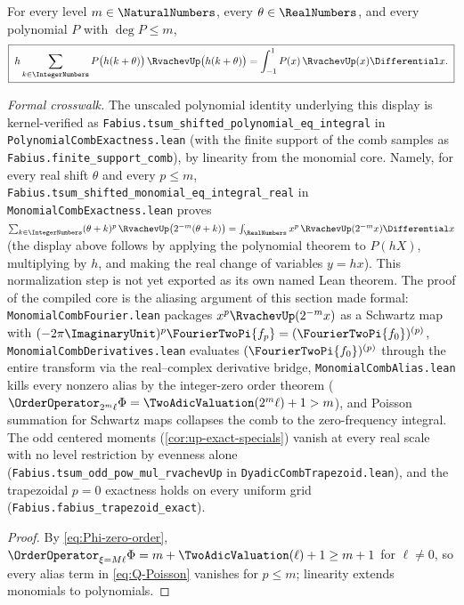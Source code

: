 \begin{theorem}
\label{thm:shifted-exactness}
For every level $m\in\NaturalNumbers$, every $\theta\in\RealNumbers$, and every polynomial
$P$ with $\deg P\le m$,
\begin{equation}
 \boxed{\;
 h\sum_{k\in\IntegerNumbers}P\bigl(h(k+\theta)\bigr)\,
 \RvachevUp\bigl(h(k+\theta)\bigr)
 =\int_{-1}^{1}P(x)\,\RvachevUp(x)\Differential x.
 \;}
 \label{eq:polynomial-exactness}
\end{equation}
\end{theorem}

\emph{Formal crosswalk.}  The unscaled polynomial identity underlying this display is
kernel-verified as \nolinkurl{Fabius.tsum_shifted_polynomial_eq_integral} in
\nolinkurl{PolynomialCombExactness.lean} (with the finite support of the comb samples
as \nolinkurl{Fabius.finite_support_comb}), by linearity from the monomial core.  Namely, for
every real shift $\theta$ and every $p\le m$,
\nolinkurl{Fabius.tsum_shifted_monomial_eq_integral_real} in
\nolinkurl{MonomialCombExactness.lean} proves
$\sum_{k\in\IntegerNumbers}(\theta+k)^{p}\,\RvachevUp\bigl(2^{-m}(\theta+k)\bigr)=\int_\RealNumbers x^{p}\,\RvachevUp(2^{-m}x)\Differential x$
(the display above follows by applying the polynomial theorem to $P(hX)$, multiplying
by $h$, and making the real change of variables $y=h x$).  This normalization step is
not yet exported as its own named Lean theorem.  The proof of the compiled core is the aliasing argument of this
section made formal: \nolinkurl{MonomialCombFourier.lean} packages $x^{p}\RvachevUp(2^{-m}x)$ as a
Schwartz map with
$(-2\pi\ImaginaryUnit)^{p}\FourierTwoPi{f_p}=(\FourierTwoPi{f_0})^{(p)}$,
\nolinkurl{MonomialCombDerivatives.lean} evaluates $(\FourierTwoPi{f_0})^{(p)}$ through the entire
transform via the real--complex derivative bridge, \nolinkurl{MonomialCombAlias.lean} kills
every nonzero alias by the integer-zero order theorem
($\OrderOperator_{2^{m}\ell}\Phi=\TwoAdicValuation(2^{m}\ell)+1>m$),
and Poisson summation for Schwartz maps collapses the comb to the zero-frequency
integral.  The odd centered moments (\cref{cor:up-exact-specials}) vanish at every real
scale with no level restriction by evenness alone
(\nolinkurl{Fabius.tsum_odd_pow_mul_rvachevUp} in \nolinkurl{DyadicCombTrapezoid.lean}), and the
trapezoidal $p=0$ exactness holds on every uniform grid
(\nolinkurl{Fabius.fabius_trapezoid_exact}).

\begin{proof}
By \eqref{eq:Phi-zero-order},
$\OrderOperator_{\xi=M\ell}\Phi=m+\TwoAdicValuation(\ell)+1\ge m+1$ for
$\ell\ne0$, so every
alias term in \eqref{eq:Q-Poisson} vanishes for $p\le m$; linearity
extends monomials to polynomials.
\end{proof}

